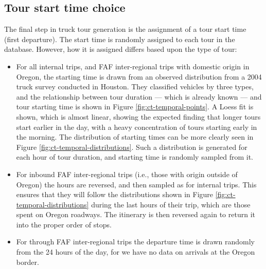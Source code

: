 \subsection{Tour start time choice}

The final step in truck tour generation is the assignment of a tour start time (first departure). The start time is randomly assigned to each tour in the database. However, how it is assigned differs based upon the type of tour:
\begin{itemize}
\item For all internal trips, and FAF inter-regional trips with domestic origin in Oregon, the starting time is drawn from an observed distribution from a 2004 truck survey conducted in Houston. They classified vehicles by three types, and the relationship between tour duration --- which is already known --- and tour starting time is shown in Figure \ref{fig:ct-temporal-points}. A Loess fit is shown, which is almost linear, showing the expected finding that longer tours start earlier in the day, with a heavy concentration of tours starting early in the morning. The distribution of starting times can be more clearly seen in Figure \ref{fig:ct-temporal-distributions}. Such a distribution is generated for each hour of tour duration, and starting time is randomly sampled from it. 
\item For inbound FAF inter-regional trips (i.e., those with origin outside of Oregon) the hours are reversed, and then sampled as for internal trips. This ensures that they will follow the distributions shown in Figure \ref{fig:ct-temporal-distributions} during the last hours of their trip, which are those spent on Oregon roadways. The itinerary is then reversed again to return it into the proper order of stops.
\item For through FAF inter-regional trips the departure time is drawn randomly from the 24 hours of the day, for we have no data on arrivals at the Oregon border.
\end{itemize}

